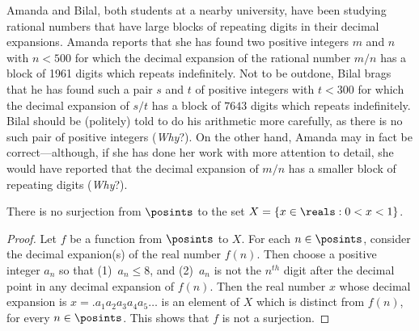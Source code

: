 \begin{example}
Amanda and Bilal, both students at a nearby university, have
been studying rational numbers that have
large blocks of repeating digits in their decimal expansions.
Amanda reports that she has found two positive integers
$m$ and $n$ with $n<500$ for which the decimal expansion
of the rational number $m/n$ has a block of 1961 digits which
repeats indefinitely.  Not to be outdone, Bilal brags that
he has found such a pair $s$ and $t$ of positive
integers with $t<300$ for which the
decimal expansion of $s/t$ has a block of $7643$ digits which
repeats indefinitely.  Bilal should be (politely) told to
do his arithmetic more carefully, as there is no such pair
of positive integers (\textit{Why}?).  On the other hand, Amanda may in fact
be correct---although, if she has done her work with more
attention to detail, she would have reported that the decimal
expansion of $m/n$ has a smaller block of repeating digits (\textit{Why}?).
\end{example}

\begin{proposition} 
There is no surjection from $\posints$ to the
set $X= \{x\in\reals:0<x<1\}$.
\end{proposition}

\begin{proof}
Let $f$ be a function from $\posints$ to $X$.
For each $n\in \posints$, consider the decimal
expanion(s) of the real number $f(n)$.  Then
choose a positive integer $a_n$ so that (1)~$a_n\le 8$, and
(2)~$a_n$ is not the $n^{th}$ digit after the decimal
point in any decimal expansion of $f(n)$.
Then the real number $x$ whose decimal expansion
is $x=.a_1a_2a_3a_4a_5\dots$ is an element of $X$
which is distinct from $f(n)$, for every $n\in\posints$.
This shows that $f$ is not a surjection.
\end{proof}

